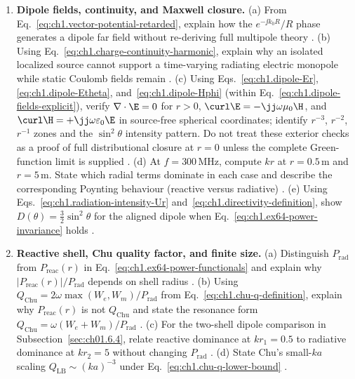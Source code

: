 \begin{enumerate}
\item \textbf{Dipole fields, continuity, and Maxwell closure.}
(a) From Eq.~\eqref{eq:ch1.vector-potential-retarded}, explain how the $e^{-\jj k_0 R}/R$ phase generates a dipole far field without re-deriving full multipole theory \cite{jackson1999,stratton1941}.
(b) Using Eq.~\eqref{eq:ch1.charge-continuity-harmonic}, explain why an isolated localized source cannot support a time-varying radiating electric monopole while static Coulomb fields remain \cite{maxwell1873,stratton1941}.
(c) Using Eqs.~\eqref{eq:ch1.dipole-Er}, \eqref{eq:ch1.dipole-Etheta}, and~\eqref{eq:ch1.dipole-Hphi} (within Eq.~\eqref{eq:ch1.dipole-fields-explicit}), verify $\nabla\cdot\E=0$ for $r>0$, $\curl\E=-\jj\omega\mu_0\H$, and $\curl\H=+\jj\omega\varepsilon_0\E$ in source-free spherical coordinates; identify $r^{-3}$, $r^{-2}$, $r^{-1}$ zones and the $\sin^2\theta$ intensity pattern. Do not treat these exterior checks as a proof of full distributional closure at $r=0$ unless the complete Green-function limit is supplied \cite{stratton1941,jackson1999}.
(d) At $f=300\,\mathrm{MHz}$, compute $kr$ at $r=0.5\,\mathrm{m}$ and $r=5\,\mathrm{m}$. State which radial terms dominate in each case and describe the corresponding Poynting behaviour (reactive versus radiative) \cite{stratton1941,poynting1884}.
(e) Using Eqs.~\eqref{eq:ch1.radiation-intensity-Ur} and~\eqref{eq:ch1.directivity-definition}, show $D(\theta)=\tfrac32\sin^2\theta$ for the aligned dipole when Eq.~\eqref{eq:ch1.ex64-power-invariance} holds \cite{harrington2001}.

\item \textbf{Reactive shell, Chu quality factor, and finite size.}
(a) Distinguish $P_{\mathrm{rad}}$ from $P_{\mathrm{reac}}(r)$ in Eq.~\eqref{eq:ch1.ex64-power-functionals} and explain why $|P_{\mathrm{reac}}(r)|/P_{\mathrm{rad}}$ depends on shell radius \cite{poynting1884,stratton1941}.
(b) Using $Q_{\mathrm{Chu}}=2\omega\max(W_e,W_m)/P_{\mathrm{rad}}$ from Eq.~\eqref{eq:ch1.chu-q-definition}, explain why $P_{\mathrm{reac}}(r)$ is not $Q_{\mathrm{Chu}}$ and state the resonance form $Q_{\mathrm{Chu}}=\omega(W_e+W_m)/P_{\mathrm{rad}}$ \cite{chu1948}.
(c) For the two-shell dipole comparison in Subsection~\ref{sec:ch01.6.4}, relate reactive dominance at $kr_1=0.5$ to radiative dominance at $kr_2=5$ without changing $P_{\mathrm{rad}}$ \cite{stratton1941}.
(d) State Chu's small-$ka$ scaling $Q_{\mathrm{LB}}\sim(ka)^{-3}$ under Eq.~\eqref{eq:ch1.chu-q-lower-bound} \cite{chu1948,harrington2001}.
\end{enumerate}
